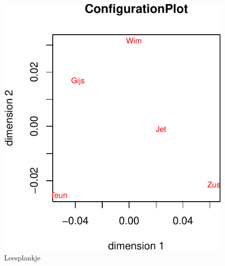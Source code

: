 \documentclass[
  12pt,
]{article}
\begin{document}
\begin{figure}

{\centering \includegraphics{smacofPC_files/figure-latex/hoogeconf-1} 

}

\caption{Leesplankje}\label{fig:hoogeconf}
\end{figure}
\end{document}
